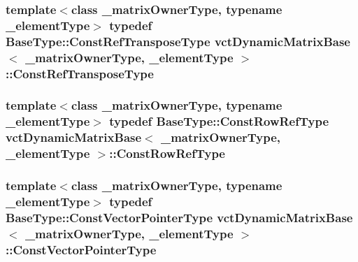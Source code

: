 \subsubsection[{Const\+Ref\+Transpose\+Type}]{\setlength{\rightskip}{0pt plus 5cm}template$<$class \+\_\+matrix\+Owner\+Type, typename \+\_\+element\+Type$>$ typedef {\bf Base\+Type\+::\+Const\+Ref\+Transpose\+Type} {\bf vct\+Dynamic\+Matrix\+Base}$<$ \+\_\+matrix\+Owner\+Type, \+\_\+element\+Type $>$\+::{\bf Const\+Ref\+Transpose\+Type}}\label{classvct_dynamic_matrix_base_a31dd42ab337cbc881f843c09aa141288}
\hypertarget{classvct_dynamic_matrix_base_ab7670bc2e61331e4228b9e9fa6885329}{}
\subsubsection[{Const\+Row\+Ref\+Type}]{\setlength{\rightskip}{0pt plus 5cm}template$<$class \+\_\+matrix\+Owner\+Type, typename \+\_\+element\+Type$>$ typedef {\bf Base\+Type\+::\+Const\+Row\+Ref\+Type} {\bf vct\+Dynamic\+Matrix\+Base}$<$ \+\_\+matrix\+Owner\+Type, \+\_\+element\+Type $>$\+::{\bf Const\+Row\+Ref\+Type}}\label{classvct_dynamic_matrix_base_ab7670bc2e61331e4228b9e9fa6885329}
\hypertarget{classvct_dynamic_matrix_base_ac8edef5d93a5e13b019a0c12744ddd18}{}
\subsubsection[{Const\+Vector\+Pointer\+Type}]{\setlength{\rightskip}{0pt plus 5cm}template$<$class \+\_\+matrix\+Owner\+Type, typename \+\_\+element\+Type$>$ typedef {\bf Base\+Type\+::\+Const\+Vector\+Pointer\+Type} {\bf vct\+Dynamic\+Matrix\+Base}$<$ \+\_\+matrix\+Owner\+Type, \+\_\+element\+Type $>$\+::{\bf Const\+Vector\+Pointer\+Type}}\label{classvct_dynamic_matrix_base_ac8edef5d93a5e13b019a0c12744ddd18}
\hypertarget{classvct_dynamic_matrix_base_a594a79de6406a638f5e725daa76294a6}{}
